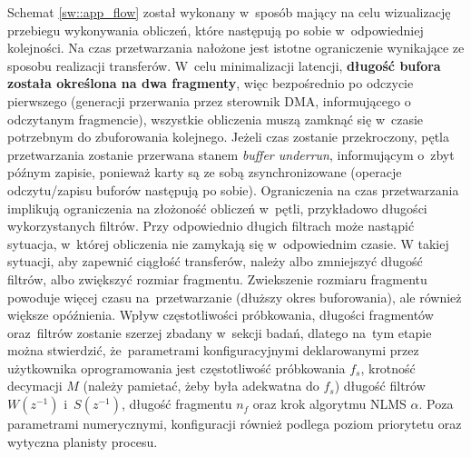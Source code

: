 Schemat \ref{sw::app_flow} został wykonany w~sposób mający na celu wizualizację
przebiegu wykonywania obliczeń, które następują po sobie w~odpowiedniej
kolejności. Na czas przetwarzania nałożone jest istotne ograniczenie wynikające
ze sposobu realizacji transferów. W~celu minimalizacji latencji, \textbf{długość
bufora została określona na dwa fragmenty}, więc bezpośrednio po odczycie
pierwszego (generacji przerwania przez sterownik DMA, informującego o odczytanym
fragmencie), wszystkie obliczenia muszą zamknąć się w~czasie potrzebnym do
zbuforowania kolejnego. Jeżeli czas zostanie przekroczony, pętla przetwarzania
zostanie przerwana stanem \textit{buffer underrun}, informującym o~zbyt późnym
zapisie, ponieważ karty są ze sobą zsynchronizowane (operacje odczytu/zapisu
buforów następują po sobie). Ograniczenia na czas przetwarzania implikują
ograniczenia na złożoność obliczeń w~pętli, przykładowo długości wykorzystanych
filtrów. Przy odpowiednio długich filtrach może nastąpić sytuacja, w~której
obliczenia nie zamykają się w~odpowiednim czasie. W takiej sytuacji, aby
zapewnić ciągłość transferów, należy albo zmniejszyć długość filtrów, albo
zwiększyć rozmiar fragmentu. Zwiekszenie rozmiaru fragmentu powoduje więcej
czasu na~przetwarzanie (dłuższy okres buforowania), ale również większe
opóźnienia. Wpływ częstotliwości próbkowania, długości fragmentów oraz~filtrów
zostanie szerzej zbadany w~sekcji badań, dlatego na~tym etapie można stwierdzić,
że~parametrami konfiguracyjnymi deklarowanymi przez użytkownika oprogramowania
jest częstotliwość próbkowania $f_s$, krotność decymacji $M$ (należy pamietać,
żeby była adekwatna do $f_s$) długość filtrów $W(z^{-1})$ i~$S(z^{-1})$, długość
fragmentu $n_f$ oraz krok algorytmu NLMS $\alpha$. Poza parametrami
numerycznymi, konfiguracji również podlega poziom priorytetu oraz wytyczna
planisty procesu.

